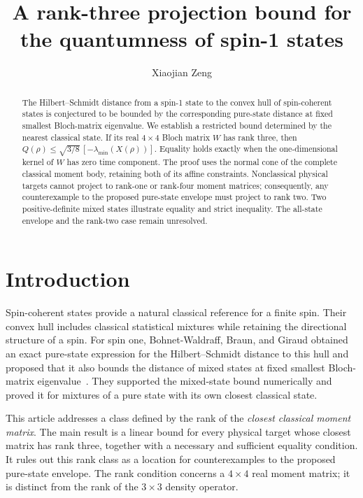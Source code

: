 \documentclass[aps,pra,reprint,amsmath,amssymb,superscriptaddress,longbibliography]{revtex4-2}
\begin{document}
\title{A rank-three projection bound for the quantumness of spin-1 states}
\author{Xiaojian Zeng}
\begin{abstract}
The Hilbert--Schmidt distance from a spin-1 state to the convex hull of spin-coherent states is conjectured to be bounded by the corresponding pure-state distance at fixed smallest Bloch-matrix eigenvalue. We establish a restricted bound determined by the nearest classical state. If its real \(4\times4\) Bloch matrix \(W\) has rank three, then \(Q(\rho)\leq\sqrt{3/8}\,[-\lambda_{\min}(X(\rho))]\). Equality holds exactly when the one-dimensional kernel of \(W\) has zero time component. The proof uses the normal cone of the complete classical moment body, retaining both of its affine constraints. Nonclassical physical targets cannot project to rank-one or rank-four moment matrices; consequently, any counterexample to the proposed pure-state envelope must project to rank two. Two positive-definite mixed states illustrate equality and strict inequality. The all-state envelope and the rank-two case remain unresolved.
\end{abstract}
\maketitle

\section{Introduction}

Spin-coherent states provide a natural classical reference for a finite spin. Their convex hull includes classical statistical mixtures while retaining the directional structure of a spin. For spin one, Bohnet-Waldraff, Braun, and Giraud obtained an exact pure-state expression for the Hilbert--Schmidt distance to this hull and proposed that it also bounds the distance of mixed states at fixed smallest Bloch-matrix eigenvalue~\cite{Bohnet2016}. They supported the mixed-state bound numerically and proved it for mixtures of a pure state with its own closest classical state.

This article addresses a class defined by the rank of the \emph{closest classical moment matrix}. The main result is a linear bound for every physical target whose closest matrix has rank three, together with a necessary and sufficient equality condition. It rules out this rank class as a location for counterexamples to the proposed pure-state envelope. The rank condition concerns a \(4\times4\) real moment matrix; it is distinct from the rank of the \(3\times3\) density operator.
\end{document}
